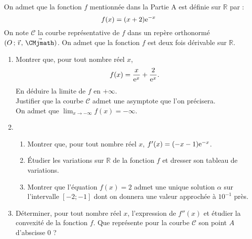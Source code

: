 \documentclass[11pt,fleqn, openany]{book} %
\begin{document}
\begin{exercise}[topic=cvx04, subtitle={(Métropole 2021)}]
On admet que la fonction $f$ mentionnée dans la Partie A est définie sur $\mathbb{R}$ par :
\[f(x)=(x+2)\mathrm{e}^{-x}\]
On note $\mathcal{C}$ la courbe représentative de $f$ dans un repère orthonormé $\Oij$.
On admet que la fonction $f$ est deux fois dérivable sur $\mathbb{R}$.
\begin{enumerate}
\item  Montrer que, pour tout nombre réel $x$,
\[f(x)=\dfrac{x}{\mathrm{e}^x}+\dfrac{2}{\mathrm{e}^x}.\]
En déduire la limite de $f$ en $+\infty$.\\
Justifier que la courbe $\mathcal{C}$ admet une asymptote que l'on précisera.\\
On admet que $\displaystyle\lim_{x \to - \infty}f(x)=-\infty$.
\item \begin{enumerate}
\item Montrer que, pour tout nombre réel $x$, $f'(x)=(-x-1)\mathrm{e}^{-x}$.
\item Étudier les variations sur $\mathbb{R}$ de la fonction $f$ et dresser son tableau de variations.
\item Montrer que l'équation $f(x) = 2$ admet une unique solution $\alpha$ sur l'intervalle $[-2; -1]$ dont on donnera une valeur approchée à $10^{-1}$ près.\end{enumerate}
\item Déterminer, pour tout nombre réel $x$, l'expression de $f''(x)$ et étudier la convexité de la fonction $f$. Que représente pour la courbe $\mathcal{C}$ son point $A$ d'abscisse 0 ?\end{enumerate}
\newpage
\end{exercise}
\end{document}

